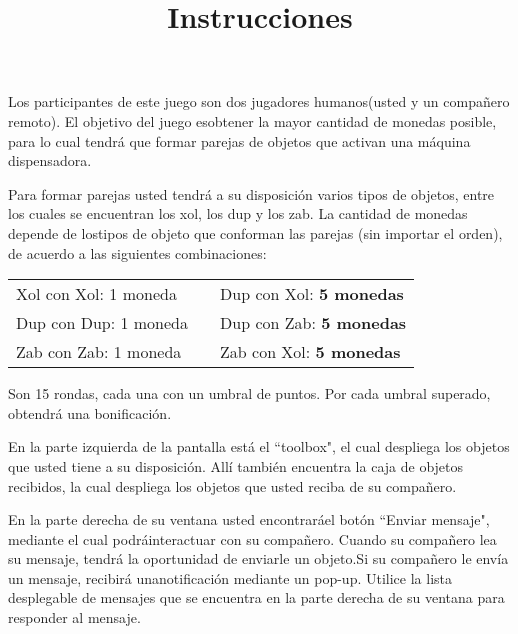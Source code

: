 \documentclass{article}
\title{Instrucciones}
\author{}
\date{}
\begin{document}
\thispagestyle{empty}

\begin{multicols}{2}{
\noindent Los participantes de este juego son dos jugadores humanos\linebreak (usted y un compañero remoto). El objetivo del juego es\linebreak obtener la mayor cantidad de monedas posible, para lo cual tendrá que formar parejas de objetos que activan una máquina dispensadora. 

\vspace{0.5\baselineskip}

\noindent Para formar parejas usted tendrá a su disposición varios tipos de objetos, entre los cuales se encuentran los xol, los dup y los zab. La cantidad de monedas depende de los\linebreak tipos de objeto que conforman las parejas (sin importar el orden), de acuerdo a las siguientes combinaciones:

\vspace{-0.25\baselineskip}

\noindent\begin{tabular}{lcl}\\
Xol con Xol: 1 moneda && Dup con Xol: \textbf{5 monedas}\\
Dup con Dup: 1 moneda && Dup con Zab: \textbf{5 monedas}\\
Zab con Zab: 1 moneda && Zab con Xol: \textbf{5 monedas}\\
\end{tabular}

\vspace{0.5\baselineskip}

\noindent Son 15 rondas, cada una con un umbral de puntos. Por cada umbral superado, obtendrá una bonificación.

\vspace{0.5\baselineskip}

\noindent En la parte izquierda de la pantalla está el ``toolbox", el cual despliega los objetos que usted tiene a su disposición. Allí también encuentra la caja de objetos recibidos, la cual despliega los objetos que usted reciba de su compañero.

\vspace{0.5\baselineskip}

\noindent En la parte derecha de su ventana usted encontrará\linebreak  el botón ``Enviar mensaje", mediante el cual podrá\linebreak  interactuar con su compañero. Cuando su compañero lea su mensaje, tendrá la oportunidad de enviarle un objeto.\linebreak  Si su compañero le envía un mensaje, recibirá una\linebreak  notificación mediante un pop-up. Utilice la lista desplegable de mensajes que se encuentra en la parte derecha de su ventana para responder al mensaje.
}\end{multicols}
\end{document}
